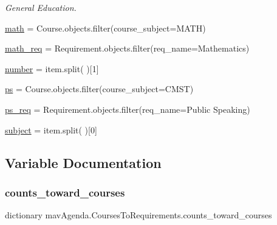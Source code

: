 \begin{DoxyCompactItemize}
\begin{DoxyCompactList}\small\item\em General Education. \end{DoxyCompactList}\item 
\mbox{\hyperlink{namespacemavAgenda_1_1CoursesToRequirements_a4af825ad30ed8317fceb0bbebc3b0a13}{math}} = Course.\+objects.\+filter(course\+\_\+subject=\textquotesingle{}M\+A\+TH\textquotesingle{})
\item 
\mbox{\hyperlink{namespacemavAgenda_1_1CoursesToRequirements_ad9489607b48eea343e60fae9cab9f5a1}{math\+\_\+req}} = Requirement.\+objects.\+filter(req\+\_\+name=\textquotesingle{}Mathematics\textquotesingle{})
\item 
\mbox{\hyperlink{namespacemavAgenda_1_1CoursesToRequirements_a14f52ce76e8c121c2e688e47bee5bc9c}{number}} = item.\+split(\textquotesingle{} \textquotesingle{})\mbox{[}1\mbox{]}
\item 
\mbox{\hyperlink{namespacemavAgenda_1_1CoursesToRequirements_a6df14428002caf79678b430a4f2a3a3c}{ps}} = Course.\+objects.\+filter(course\+\_\+subject=\textquotesingle{}C\+M\+ST\textquotesingle{})
\item 
\mbox{\hyperlink{namespacemavAgenda_1_1CoursesToRequirements_a14c74c27f6ae7698604d50f053677cea}{ps\+\_\+req}} = Requirement.\+objects.\+filter(req\+\_\+name=\textquotesingle{}Public Speaking\textquotesingle{})
\item 
\mbox{\hyperlink{namespacemavAgenda_1_1CoursesToRequirements_a6b8eea6e735b0b2719a9119de39befec}{subject}} = item.\+split(\textquotesingle{} \textquotesingle{})\mbox{[}0\mbox{]}
\end{DoxyCompactItemize}


\subsection{Variable Documentation}
\mbox{\label{namespacemavAgenda_1_1CoursesToRequirements_a921d8c4725c512515a269cd5c93346ff}} 
\subsubsection{\texorpdfstring{counts\+\_\+toward\+\_\+courses}{counts\_toward\_courses}}
{\footnotesize\ttfamily dictionary mav\+Agenda.\+Courses\+To\+Requirements.\+counts\+\_\+toward\+\_\+courses}



